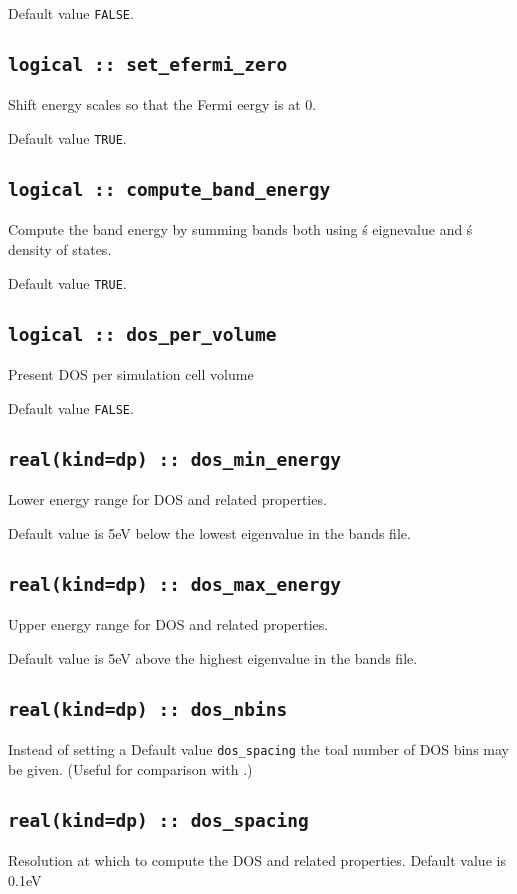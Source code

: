 \documentclass[a4paper,11pt,twoside]{book}
\begin{document}
Default value \verb#FALSE#.

\subsection[set\_efermi\_zero]{\tt logical :: set\_efermi\_zero}
Shift energy scales so that the Fermi eergy is at 0.

Default value \verb#TRUE#.

\subsection[compute\_band\_energy]{\tt logical :: compute\_band\_energy}
Compute the band energy by summing bands both using \castep\'s eignevalue and \optados\'s density of states.

Default value \verb#TRUE#.

\subsection[dos\_per\_volume]{\tt logical :: dos\_per\_volume}
Present DOS per simulation cell volume

Default value \verb#FALSE#.

\subsection[dos\_min\_energy]{\tt real(kind=dp) :: dos\_min\_energy}
Lower energy range for DOS and related properties.

Default value is 5eV below the lowest eigenvalue in the bands file.

\subsection[dos\_max\_energy]{\tt real(kind=dp) :: dos\_max\_energy}
Upper energy range for DOS and related properties.

Default value is 5eV above the highest eigenvalue in the bands file.


\subsection[dos\_nbins]{\tt real(kind=dp) :: dos\_nbins}
Instead of setting a Default value \verb#dos_spacing# the toal number of DOS bins may be given.  (Useful for comparison with \lindos.)

\subsection[dos\_spacing]{\tt real(kind=dp) :: dos\_spacing}
Resolution at which to compute the DOS and related properties.
Default value is 0.1eV 
\end{document}
